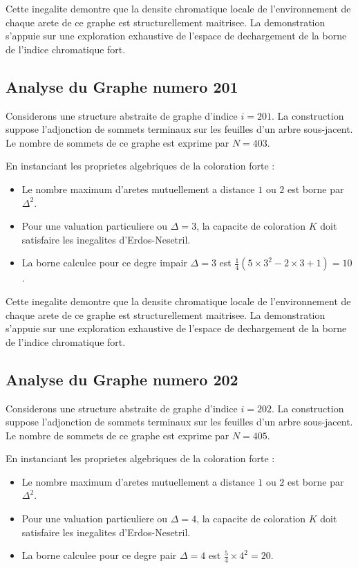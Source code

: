 \documentclass[11pt,a4paper]{article}
\begin{document}
Cette inegalite demontre que la densite chromatique locale de l'environnement de chaque arete de ce graphe est structurellement maitrisee. La demonstration s'appuie sur une exploration exhaustive de l'espace de dechargement de la borne de l'indice chromatique fort.

\subsection{Analyse du Graphe numero 201}
Considerons une structure abstraite de graphe d'indice $i = 201$. La construction suppose l'adjonction de sommets terminaux sur les feuilles d'un arbre sous-jacent. Le nombre de sommets de ce graphe est exprime par $N = 403$.

En instanciant les proprietes algebriques de la coloration forte :
\begin{itemize}
\item Le nombre maximum d'aretes mutuellement a distance $1$ ou $2$ est borne par $\Delta^2$.
\item Pour une valuation particuliere ou $\Delta = 3$, la capacite de coloration $K$ doit satisfaire les inegalites d'Erdos-Nesetril.
\item La borne calculee pour ce degre impair $\Delta = 3$ est $\frac{1}{4}(5 \times 3^2 - 2 \times 3 + 1) = 10$.
\end{itemize}

Cette inegalite demontre que la densite chromatique locale de l'environnement de chaque arete de ce graphe est structurellement maitrisee. La demonstration s'appuie sur une exploration exhaustive de l'espace de dechargement de la borne de l'indice chromatique fort.

\subsection{Analyse du Graphe numero 202}
Considerons une structure abstraite de graphe d'indice $i = 202$. La construction suppose l'adjonction de sommets terminaux sur les feuilles d'un arbre sous-jacent. Le nombre de sommets de ce graphe est exprime par $N = 405$.

En instanciant les proprietes algebriques de la coloration forte :
\begin{itemize}
\item Le nombre maximum d'aretes mutuellement a distance $1$ ou $2$ est borne par $\Delta^2$.
\item Pour une valuation particuliere ou $\Delta = 4$, la capacite de coloration $K$ doit satisfaire les inegalites d'Erdos-Nesetril.
\item La borne calculee pour ce degre pair $\Delta = 4$ est $\frac{5}{4} \times 4^2 = 20$.
\end{itemize}
\end{document}
